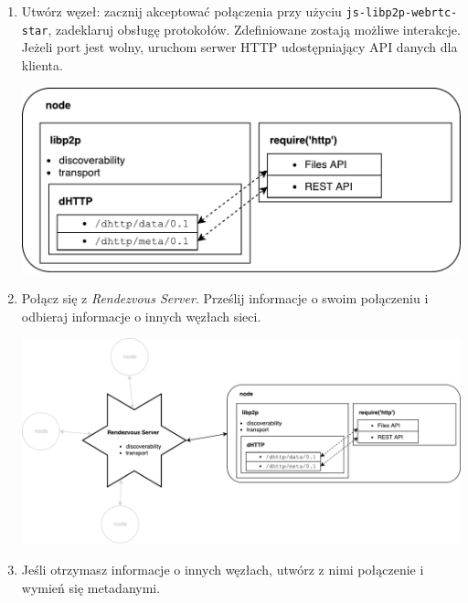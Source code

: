 \begin{enumerate}[noitemsep]
    \item Utwórz węzeł: zacznij akceptować połączenia przy użyciu \texttt{js-libp2p-webrtc-star}, zadeklaruj obsługę protokołów. Zdefiniowane zostają możliwe interakcje. Jeżeli port jest wolny, uruchom serwer HTTP udostępniający API danych dla klienta. \\ \parbox{\linewidth}{\centering \includegraphics[scale=0.6]{nodeHiLevel.pdf}}

    \item Połącz się z {\em Rendezvous Server}. Prześlij informacje o swoim połączeniu i odbieraj informacje o innych węzłach sieci. \\ \parbox{\linewidth}{\centering \includegraphics[scale=0.45]{node-with-rs-n-neighbors.pdf}}

    \item Jeśli otrzymasz informacje o innych węzłach, utwórz z nimi połączenie i wymień się metadanymi. 


\end{enumerate}
